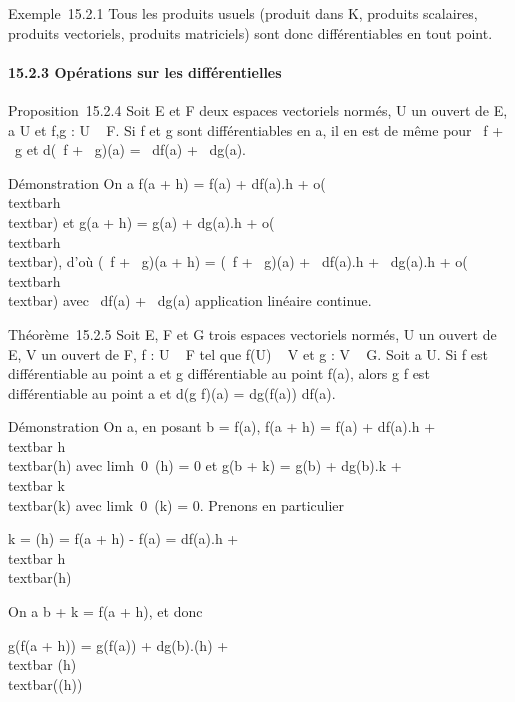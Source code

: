 Exemple~15.2.1 Tous les produits usuels (produit dans K, produits
scalaires, produits vectoriels, produits matriciels) sont donc
différentiables en tout point.

\paragraph{15.2.3 Opérations sur les différentielles}

Proposition~15.2.4 Soit E et F deux espaces vectoriels normés, U un
ouvert de E, a \in U et f,g : U \rightarrow~ F. Si f et g sont différentiables en a,
il en est de même pour \alpha~f + \beta~g et d(\alpha~f + \beta~g)(a) = \alpha~df(a) + \beta~dg(a).

Démonstration On a f(a + h) = f(a) + df(a).h +
o(\\textbar{}h\\textbar{}) et g(a + h) =
g(a) + dg(a).h +
o(\\textbar{}h\\textbar{}), d'où (\alpha~f +
\beta~g)(a + h) = (\alpha~f + \beta~g)(a) + \alpha~df(a).h + \beta~dg(a).h +
o(\\textbar{}h\\textbar{}) avec \alpha~df(a) +
\beta~dg(a) application linéaire continue.

Théorème~15.2.5 Soit E, F et G trois espaces vectoriels normés, U un
ouvert de E, V un ouvert de F, f : U \rightarrow~ F tel que f(U) \subset~ V et g : V \rightarrow~ G.
Soit a \in U. Si f est différentiable au point a et g différentiable au
point f(a), alors g \cdot f est différentiable au point a et d(g \cdot f)(a) =
dg\left (f(a)\right ) \cdot df(a).

Démonstration On a, en posant b = f(a), f(a + h) = f(a) + df(a).h
+\\textbar{} h\\textbar{}\epsilon(h) avec
limh\rightarrow~0~\epsilon(h) = 0 et g(b + k) = g(b) +
dg(b).k +\\textbar{} k\\textbar{}\eta(k) avec
limk\rightarrow~0~\eta(k) = 0. Prenons en
particulier

k = \phi(h) = f(a + h) - f(a) = df(a).h +\\textbar{}
h\\textbar{}\epsilon(h)

On a b + k = f(a + h), et donc

g(f(a + h)) = g(f(a)) + dg(b).\phi(h) +\\textbar{}
\phi(h)\\textbar{}\eta(\phi(h))

